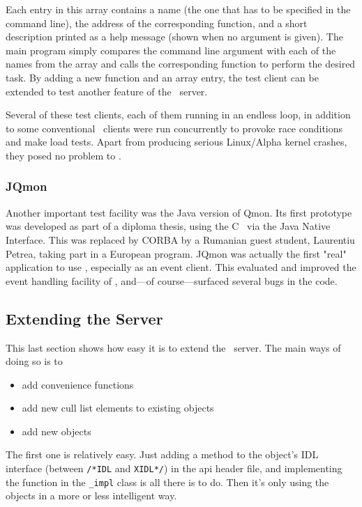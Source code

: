 Each entry in this array contains a name (the one that has to be specified in
the command line), the address of the corresponding function, and a short
description printed as a help message (shown when no argument is given). The
main program simply compares the command line argument with each of the names
from the array and calls the corresponding function to perform the desired
task. By adding a new function and an array entry, the test client can be
extended to test another feature of the \qidl\ server.

Several of these test clients, each of them running in an endless loop, in
addition to some conventional \codapi\ clients were run concurrently to
provoke race conditions and make load tests. Apart from producing serious
Linux/Alpha kernel crashes, they posed no problem to \qidl.

\subsubsection{JQmon}
Another important test facility was the Java version of Qmon. Its first
prototype was developed as part of a diploma thesis, using the C \codapi\ via
the Java Native Interface. This was replaced by CORBA by a Rumanian
guest student, Laurentiu Petrea, taking part in a European program.
JQmon was actually the first "real"
application to use \qidl, especially as an event client. This evaluated and
improved the event handling facility of \qidl, and---of course---surfaced
several bugs in the code.

\subsection{\label{s_prog_extending}Extending the Server}
This last section shows how easy it is to extend the \qidl\ server. The 
main ways of doing so is to

\begin{itemize}
\item add convenience functions
\item add new cull list elements to existing objects
\item add new objects
\end{itemize}

The first one is relatively easy. Just adding a method to the object's IDL
interface (between \texttt{/*IDL} and \texttt{XIDL*/}) in the api header
file, and implementing the function in the \texttt{\_impl} class is all there
is to do. Then it's only using the objects in a more or less intelligent way.

